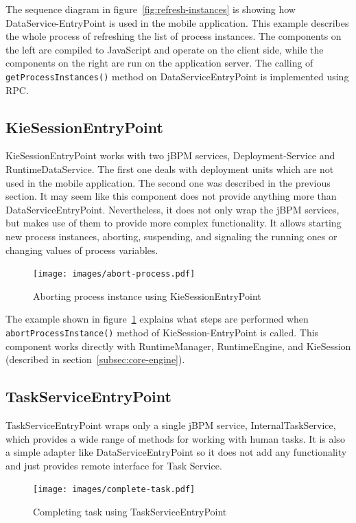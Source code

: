 \documentclass[12pt,oneside,final]{fithesis2}
\begin{document}
The sequence diagram in figure~\ref{fig:refresh-instances} is showing how DataService-EntryPoint is used in the mobile application.
This example describes the whole process of refreshing the list of process instances.
The components on the left are compiled to JavaScript and operate on the client side, while the components on the right are run on the application server.
The calling of \verb|getProcessInstances()| method on DataServiceEntryPoint is implemented using RPC.

\subsection{KieSessionEntryPoint}

KieSessionEntryPoint works with two jBPM services, Deployment-Service and RuntimeDataService.
The first one deals with deployment units which are not used in the mobile application.
The second one was described in the previous section.
It may seem like this component does not provide anything more than DataServiceEntryPoint.
Nevertheless, it does not only wrap the jBPM services, but makes use of them to provide more complex functionality.
It allows starting new process instances, aborting, suspending, and signaling the running ones or changing values of process variables.

\begin{figure}[ht!]
\centering
\texttt{[image: images/abort-process.pdf]}
\caption{Aborting process instance using KieSessionEntryPoint}
\label{fig:abort-process}
\end{figure}

The example shown in figure~\ref{fig:abort-process} explains what steps are performed when \verb|abortProcessInstance()| method of KieSession-EntryPoint is called.
This component works directly with RuntimeManager, RuntimeEngine, and KieSession (described in section~\ref{subsec:core-engine}).

\subsection{TaskServiceEntryPoint}

TaskServiceEntryPoint wraps only a single jBPM service, InternalTaskService, which provides a wide range of methods for working with human tasks.
It is also a simple adapter like DataServiceEntryPoint so it does not add any functionality and just provides remote interface for Task Service.

\begin{figure}[ht!]
\centering
\texttt{[image: images/complete-task.pdf]}
\caption{Completing task using TaskServiceEntryPoint}
\label{fig:complete-task}
\end{figure}
\end{document}
